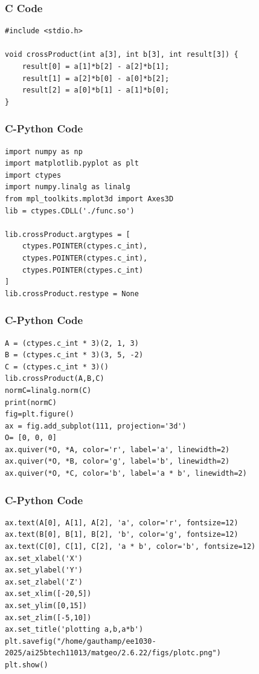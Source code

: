 \documentclass{beamer}
\begin{document}
\begin{frame}[fragile]
    \frametitle{C Code}

    \begin{lstlisting}
#include <stdio.h>

void crossProduct(int a[3], int b[3], int result[3]) {
    result[0] = a[1]*b[2] - a[2]*b[1];
    result[1] = a[2]*b[0] - a[0]*b[2];
    result[2] = a[0]*b[1] - a[1]*b[0];
}
    \end{lstlisting}
\end{frame}

\begin{frame}[fragile]
    \frametitle{C-Python Code}

    \begin{lstlisting}
import numpy as np
import matplotlib.pyplot as plt
import ctypes
import numpy.linalg as linalg
from mpl_toolkits.mplot3d import Axes3D
lib = ctypes.CDLL('./func.so')

lib.crossProduct.argtypes = [
    ctypes.POINTER(ctypes.c_int),  
    ctypes.POINTER(ctypes.c_int),  
    ctypes.POINTER(ctypes.c_int)   
]
lib.crossProduct.restype = None
    \end{lstlisting}
\end{frame}

\begin{frame}[fragile]
    \frametitle{C-Python Code}

    \begin{lstlisting}
A = (ctypes.c_int * 3)(2, 1, 3)
B = (ctypes.c_int * 3)(3, 5, -2)
C = (ctypes.c_int * 3)()
lib.crossProduct(A,B,C)
normC=linalg.norm(C)
print(normC)
fig=plt.figure()
ax = fig.add_subplot(111, projection='3d') 
O= [0, 0, 0] 
ax.quiver(*O, *A, color='r', label='a', linewidth=2) 
ax.quiver(*O, *B, color='g', label='b', linewidth=2)
ax.quiver(*O, *C, color='b', label='a * b', linewidth=2)
    \end{lstlisting}
\end{frame}

\begin{frame}[fragile]
    \frametitle{C-Python Code}
    \begin{lstlisting}
ax.text(A[0], A[1], A[2], 'a', color='r', fontsize=12)
ax.text(B[0], B[1], B[2], 'b', color='g', fontsize=12)
ax.text(C[0], C[1], C[2], 'a * b', color='b', fontsize=12)
ax.set_xlabel('X')
ax.set_ylabel('Y')
ax.set_zlabel('Z')
ax.set_xlim([-20,5]) 
ax.set_ylim([0,15])
ax.set_zlim([-5,10])
ax.set_title('plotting a,b,a*b')
plt.savefig("/home/gauthamp/ee1030-2025/ai25btech11013/matgeo/2.6.22/figs/plotc.png")
plt.show()
    \end{lstlisting}
\end{frame}
\end{document}

